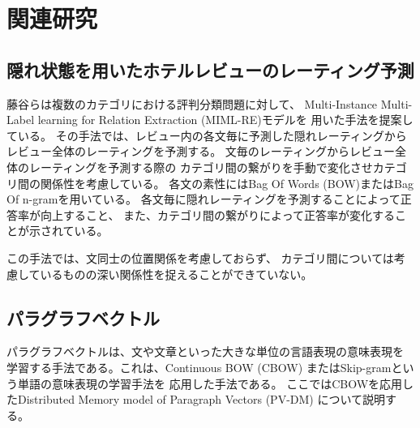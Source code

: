 \documentclass[twocolumn,a4paper]{ltjarticle}
\begin{document}



\section{関連研究}

\subsection{隠れ状態を用いたホテルレビューのレーティング予測}

藤谷ら\cite{fujitani15}は複数のカテゴリにおける評判分類問題に対して、
Multi-Instance Multi-Label learning for Relation Extraction (MIML-RE)モデルを
用いた手法を提案している。
その手法では、レビュー内の各文毎に予測した隠れレーティングから
レビュー全体のレーティングを予測する。
文毎のレーティングからレビュー全体のレーティングを予測する際の
カテゴリ間の繋がりを手動で変化させカテゴリ間の関係性を考慮している。
各文の素性にはBag Of Words (BOW)またはBag Of n-gramを用いている。
各文毎に隠れレーティングを予測することによって正答率が向上すること、
また、カテゴリ間の繋がりによって正答率が変化することが示されている。

この手法では、文同士の位置関係を考慮しておらず、
カテゴリ間については考慮しているものの深い関係性を捉えることができていない。


\subsection{パラグラフベクトル}

パラグラフベクトルは、文や文章といった大きな単位の言語表現の意味表現を
学習する手法である。これは、Continuous BOW (CBOW)
またはSkip-gram\cite{yoshua03}という単語の意味表現の学習手法を
応用した手法である。
ここではCBOWを応用したDistributed Memory model of Paragraph Vectors (PV-DM)
について説明する。
\end{document}
